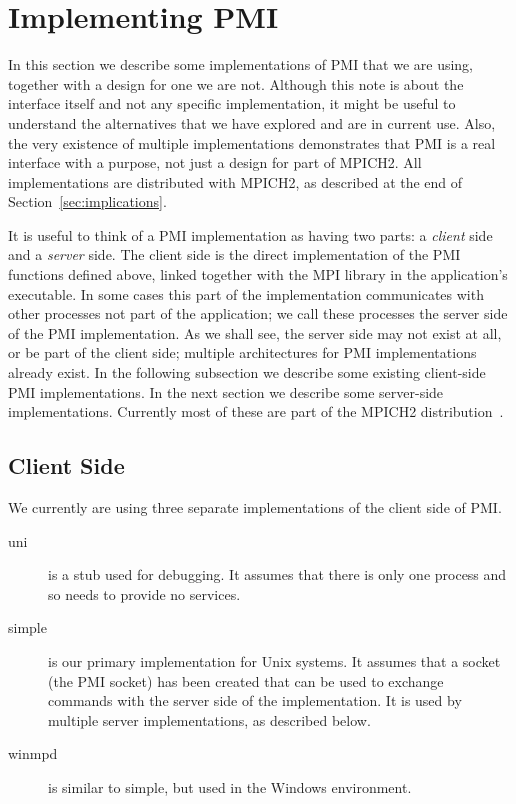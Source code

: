 \documentclass[11pt]{article}
\begin{document}
\section{Implementing PMI}
\label{sec:implementing}

In this section we describe some implementations of PMI that we are
using, together with a design for one we are not.  Although this note is
about the interface itself and not any specific implementation, it might
be useful to understand the alternatives that we have explored and are
in current use.  Also, the very existence of multiple implementations
demonstrates that PMI is a real interface with a purpose, not just a
design for part of MPICH2.  All implementations are distributed with
MPICH2, as described at the end of Section~\ref{sec:implications}.

It is useful to think of a PMI implementation as having two parts: a 
{\em client\/} side and a {\em server\/} side.  The client side is the
direct implementation of the PMI functions defined above, linked together
with the MPI library in the application's executable.  In some cases this
part of the implementation communicates with other processes not part of
the application;  we call these processes the server side of the PMI
implementation.  As we shall see, the server side may not exist at all,
or be part of the client side; multiple architectures for PMI
implementations already exist.  In the following subsection we describe some
existing client-side PMI implementations.  In the next section we
describe some server-side implementations.  Currently most of these are
part of the MPICH2 distribution~\cite{mpich2-web-page}.


\subsection{Client Side}
\label{sec:client-side}

We currently are using three separate implementations of the client side of PMI.
\begin{description}
\item[uni] is a stub used for debugging.  It assumes that there is only one
  process and so needs to provide no services.
\item[simple] is our primary implementation for Unix systems.  It
  assumes that a socket (the PMI socket) has been created that can be
  used to exchange commands with the server side of the implementation.
  It is used by multiple server implementations, as described below.
\item[winmpd] is similar to simple, but used in the Windows environment.
\end{description}
\end{document}
